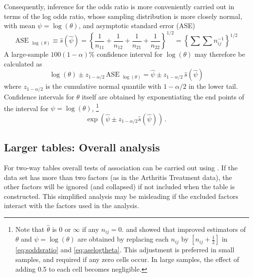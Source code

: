 \documentclass[11pt]{book}
\begin{document}
Consequently, inference for the odds ratio
is more conveniently carried out in terms of the log odds ratio,
whose sampling distribution is more closely normal, with mean
$\psi = \log (\theta)$, and asymptotic standard error (ASE)
\begin{equation}\label{eq:aselogtheta}
 \mbox{ASE }_{\log (\theta)} \equiv \hat{s} (\hat{\psi} ) =
 {\left\{
 \frac{1}{n_{11}} + \frac{1}{n_{12}} + \frac{1}{n_{21}} + \frac{1}{n_{22}}
 \right \} }^{1/2}
 =   {\left\{ \sum \sum n_{ij}^{-1} \right \} }^{1/2}
\end{equation}
A large-sample $100(1-\alpha)$\% confidence interval for $\log (\theta)$ may therefore
be calculated as 
\begin{equation*}
\log (\theta) \pm z_{1-\alpha/2} \, \mbox{ASE }_{\log (\theta)}
= \hat{\psi} \pm z_{1-\alpha/2}  \, \hat{s} (\hat{\psi} )
\end{equation*}
where $z_{ 1 - \alpha  / 2 }$ is the cumulative normal quantile with
$1-\alpha/2$ in the lower tail.
Confidence intervals for $\theta$ itself are obtained by exponentiating
the end points of the interval for $\psi = \log (\theta)$,%
\footnote{
Note that $\hat{\theta}$ is 0 or $\infty$ if any $n_{ij}=0$.
\citet{Haldane:55} and \citet{GartZweiful:67} showed that improved
estimators of $\theta$ and $\psi = \log (\theta)$ are obtained by
replacing each $n_{ij}$ by $[n_{ij} + \frac{1}{2}]$ in \eqref{eq:soddsratio}
and \eqref{eq:aselogtheta}.
This adjustment is preferred in small samples, and required if any
zero cells occur.  In large samples, the effect of adding 0.5 to each
cell becomes negligible.
}
\begin{equation*}
\exp \left(\hat{\psi}  \pm z_{ 1 - \alpha  / 2 } \hat{s} (\hat{\psi} ) \right)
\period
\end{equation*}



\subsection{Larger tables: Overall analysis}\label{sec:twoway-overall}

For two-way tables overall tests of association can be carried out
using .
If the data set has more than two factors (as in the
Arthritis Treatment data), the other factors will be
ignored (and collapsed) if not included when the table is constructed.
This simplified analysis may be misleading if
the excluded factors interact with the factors used in the
analysis.
\end{document}
